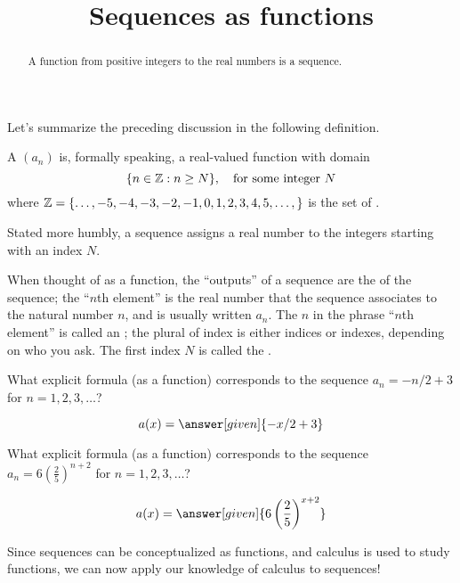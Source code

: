 \documentclass{ximera}
\title[Dig-In:]{Sequences as functions}
\begin{document}
\begin{abstract}
  A function from positive integers to the real numbers is a sequence.
\end{abstract}
\maketitle

Let's summarize the preceding discussion in the following definition.
\begin{definition}
  A  $(a_n)$ is, formally speaking, a real-valued
  function with domain
  \[
  \{ n \in \mathbb Z : n \ge N \},\quad \text{for some integer $N$}
  \]
  where $\mathbb Z = \{\dots, -5,-4,-3,-2,-1,0,1,2,3,4,5,\dots,\}$ is the set
  of .
\end{definition}

Stated more humbly, a sequence assigns a real number to the integers
starting with an index $N$.

When thought of as a function, the ``outputs'' of a sequence are the
 of the sequence; the ``$n$th element'' is the real
number that the sequence associates to the natural number $n$, and is
usually written $a_n$.  The $n$ in the phrase
``$n$th element'' is called an ; the
plural of index is either indices or indexes, depending on who you
ask.  The first index $N$ is called the .

\begin{question}
  What explicit formula (as a function) corresponds to the sequence
  $a_n = -n/2+3$ for $n=1,2,3,\dots$?
  \begin{prompt}
    \[
    a(x) = \answer[given]{-x/2 + 3}
    \]
  \end{prompt}
\end{question}

\begin{question}
  What explicit formula (as a function) corresponds to the sequence
  $a_n = 6\left(\frac{2}{5}\right)^{n+2}$ for $n=1,2,3,\dots$?
  \begin{prompt}
    \[
    a(x) = \answer[given]{6\left(\frac{2}{5}\right)^{x+2}}
    \]
  \end{prompt}
\end{question}

Since sequences can be conceptualized as functions, and calculus is
used to study functions, we can now apply our knowledge of calculus to
sequences!
\end{document}
